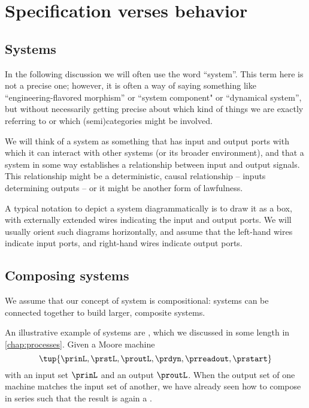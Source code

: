 
\section{Specification verses behavior}

\subsection{Systems}

In the following discussion we will often use the word ``system''. This term here is not a precise one; however, it is often a way of saying something like ``engineering-flavored morphism'' or ``system component" or ``dynamical system'', but without necessarily getting precise about which kind of things we are exactly referring to or which (semi)categories might be involved. 

We will think of a system as something that has input and output ports with which it can interact with other systems (or its broader environment), and that a system in some way establishes a relationship between input and output signals. This relationship might be a deterministic, causal relationship -- inputs determining outputs -- or it might be another form of lawfulness.

A typical notation to depict a system diagrammatically is to draw it as a box, with externally extended wires indicating the input and output ports. We will usually orient such diagrams horizontally, and assume that the left-hand wires indicate input ports, and right-hand wires indicate output ports.


\subsection{Composing systems}

We assume that our concept of system is compositional: systems can be connected together to build larger, composite systems. 

An illustrative example of systems are , which we discussed in some length in \cref{chap:processes}.
Given a Moore machine
\begin{equation}
    \label{eq:moore-machine-specification}
    \tup{\prinL,\prstL,\proutL,\prdyn,\prreadout,\prstart}
\end{equation}
with an input set $\prinL$ and an output $\proutL$.
When the output set of one machine matches the input set of another, we have already seen how to compose  in series such that the result is again a .


